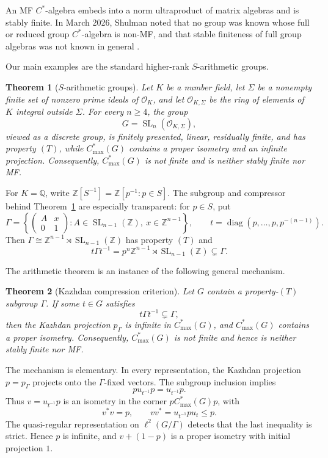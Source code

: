 \documentclass[11pt]{article}
\newtheorem{theorem}{Theorem}[section]
\newcommand{\Q}{\mathbb Q}
\newcommand{\Z}{\mathbb Z}
\newcommand{\OK}{\mathcal O_K}
\newcommand{\OS}{\mathcal O_{K,\Sigma}}
\newcommand{\SL}{\operatorname{SL}}
\newcommand{\Cmax}[1]{C^*_{\max}(#1)}
\begin{document}
An MF $C^*$-algebra embeds into a norm ultraproduct of matrix algebras and is
stably finite.  In March 2026, Shulman noted that no group was known whose
full or reduced group $C^*$-algebra is non-MF, and that stable finiteness of
full group algebras was not known in general \cite[Introduction]{Shulman}.

Our main examples are the standard higher-rank $S$-arithmetic groups.

\begin{theorem}[$S$-arithmetic groups]\label{thm:sarithmetic}
Let $K$ be a number field, let $\Sigma$ be a nonempty finite set of nonzero
prime ideals of $\OK$, and let $\OS$ be the ring of elements of $K$ integral
outside $\Sigma$.  For every $n\geq4$, the group
\[
 G=\SL_n(\OS),
\]
viewed as a discrete group, is finitely presented, linear, residually finite,
and has property $(T)$, while $\Cmax G$ contains a proper isometry and an
infinite projection.  Consequently, $\Cmax G$ is not finite and is neither
stably finite nor MF.
\end{theorem}

For $K=\Q$, write $\Z[S^{-1}]=\Z[p^{-1}:p\in S]$.  The subgroup and
compressor behind Theorem~\ref{thm:sarithmetic} are especially transparent:
for $p\in S$, put
\[
 \Gamma=
 \left\{
 \begin{pmatrix}A&x\\0&1\end{pmatrix}:
 A\in\SL_{n-1}(\Z),\ x\in\Z^{n-1}
 \right\},
 \qquad
 t=\operatorname{diag}(p,\ldots,p,p^{-(n-1)}).
\]
Then $\Gamma\cong\Z^{n-1}\rtimes\SL_{n-1}(\Z)$ has property $(T)$ and
\[
 t\Gamma t^{-1}
 =p^n\Z^{n-1}\rtimes\SL_{n-1}(\Z)
 \subsetneq\Gamma.
\]

The arithmetic theorem is an instance of the following general mechanism.

\begin{theorem}[Kazhdan compression criterion]\label{thm:criterion}
Let $G$ contain a property-$(T)$ subgroup $\Gamma$.  If some $t\in G$
satisfies
\[
 t\Gamma t^{-1}\subsetneq\Gamma,
\]
then the Kazhdan projection $p_\Gamma$ is infinite in $\Cmax G$, and
$\Cmax G$ contains a proper isometry.  Consequently, $\Cmax G$ is not
finite and hence is neither stably finite nor MF.
\end{theorem}

The mechanism is elementary.  In every representation, the Kazhdan
projection $p=p_\Gamma$ projects onto the $\Gamma$-fixed vectors.  The
subgroup inclusion implies
\[
 p u_{t^{-1}}p=u_{t^{-1}}p.
\]
Thus $v=u_{t^{-1}}p$ is an isometry in the corner $p\Cmax Gp$, with
\[
 v^*v=p,
 \qquad
 vv^*=u_{t^{-1}}pu_t\leq p.
\]
The quasi-regular representation on $\ell^2(G/\Gamma)$ detects that the last
inequality is strict.  Hence $p$ is infinite, and $v+(1-p)$ is a proper
isometry with initial projection $1$.
\end{document}
